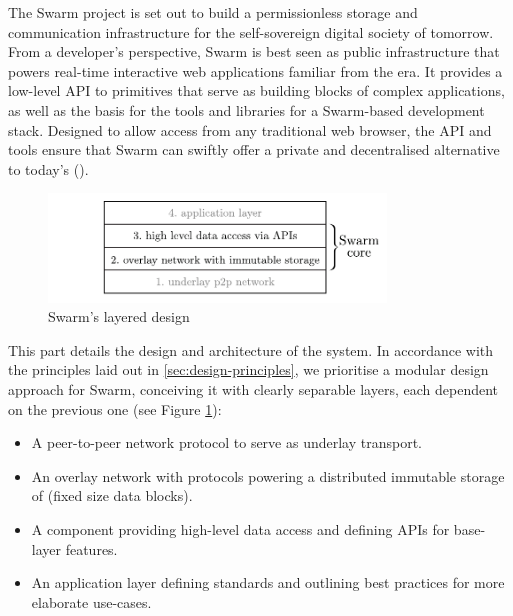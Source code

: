 
\green{}

The Swarm project is set out to build a permissionless storage and communication infrastructure for the self-sovereign digital society of tomorrow. From a developer's perspective, Swarm is best seen as public infrastructure that powers real-time interactive web applications familiar from the  era. It provides a low-level API to primitives that serve as building blocks of complex applications, as well as the basis for the tools and libraries for a Swarm-based  development stack. Designed to allow access from any traditional web browser, the API and tools ensure that Swarm can swiftly offer a private and decentralised alternative to today's  ().

\begin{figure}[htbp]
  \centering
    \includegraphics[width=0.8\textwidth]{fig/swarm-layered-design_new.pdf}
  \caption[Swarm's layered design \statusgreen]{Swarm's layered design}
\label{fig:Swarm-layered-design}
\end{figure}

This part details the design and architecture of the system. In accordance with the principles laid out in \ref{sec:design-principles}, we prioritise a modular design approach for Swarm, conceiving it with clearly separable layers, each dependent on the previous one (see Figure \ref{fig:Swarm-layered-design}):

\begin{itemize}
\item[(1)] {A peer-to-peer network protocol to serve as underlay transport.}
\item[(2)] {An overlay network with protocols powering a distributed immutable storage of  (fixed size data blocks).}
\item[(3)] {A component providing high-level data access and defining APIs for base-layer features.}
\item[(4)] {An application layer defining standards and outlining best practices for more elaborate use-cases.}
\end{itemize}

